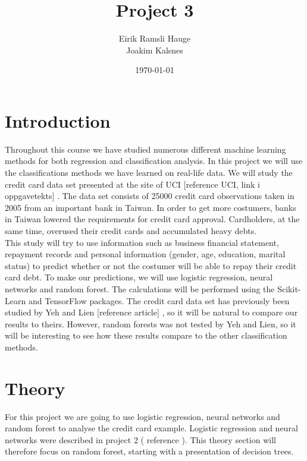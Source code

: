 \documentclass[12pt]{article}
\title{Project 3}
\author{Eirik Ramsli Hauge\\
Joakim Kalsnes
}
\date{\today}
\numberwithin{figure}{section}
\newcommand{\husk}[1]{\color{red} #1 \color{black}}
\begin{document}
\maketitle

\section{Introduction}
Throughout this course we have studied numerous different machine learning methods for both regression and classification analysis. In this project we will use the classifications methods we have learned on real-life data. We will study the credit card data set presented at the site of UCI \husk{[reference UCI, link i oppgavetekts]}. The data set consists of 25000 credit card observations taken in 2005 from an important bank in Taiwan. In order to get more costumers, banks in Taiwan lowered the requirements for credit card approval. Cardholders, at the same time, overused their credit cards and accumulated heavy debts.\\
This study will try to use information such as business financial statement, repayment records and personal information (gender, age, education, marital status) to predict whether or not the costumer will be able to repay their credit card debt. To make our predictions, we will use logistic regression, neural networks and random forest. The calculations will be performed using the Scikit-Learn and TensorFlow packages. The credit card data set has previously been studied by Yeh and Lien \husk{[reference article]}, so it will be natural to compare our results to theirs. However, random forests was not tested by Yeh and Lien, so it will be interesting to see how these results compare to the other classification methods.\\


\section{Theory}
For this project we are going to use logistic regression, neural networks and random forest to analyse the credit card example. Logistic regression and neural networks were described in project 2 (\husk{reference}). This theory section will therefore focus on random forest, starting with a presentation of decision trees.
\end{document}
